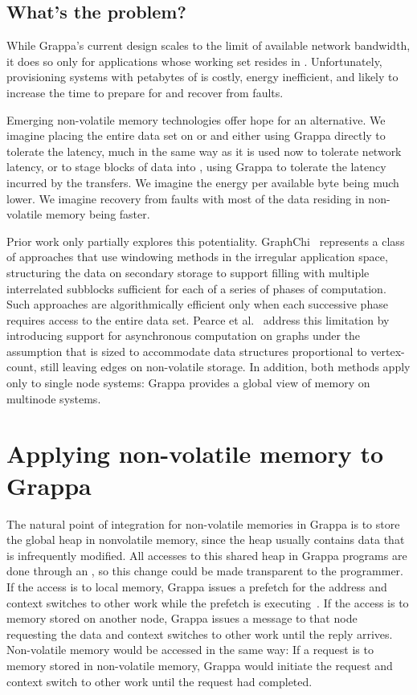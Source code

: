 \subsection{What's the problem?}

While Grappa's current design scales to the limit of available network
bandwidth, it does so only for applications whose working set resides
in \@.  Unfortunately, provisioning systems with petabytes of  is
costly, energy inefficient, and likely to increase the time to prepare
for and recover from faults.

Emerging non-volatile memory technologies offer hope for an
alternative.  We imagine placing the entire data set on  or  and
either using Grappa directly to tolerate the latency, much in the same
way as it is used now to tolerate network latency, or to stage blocks
of data into , using Grappa to tolerate the latency incurred by the
transfers.  We imagine the energy per available byte being much lower.
We imagine recovery from faults with most of the data residing in
non-volatile memory being faster.

Prior work only partially explores this potentiality. GraphChi~\cite{graphchi:osdi12}
represents a class of approaches that use windowing methods in the
irregular application space, structuring the data on secondary storage
to support filling  with multiple interrelated subblocks sufficient
for each of a series of phases of computation.  Such approaches are
algorithmically efficient only when each successive phase requires
access to the entire data set.  Pearce et al.~\cite{magt:2010} address this limitation by
introducing support for asynchronous computation on graphs under the
assumption that  is sized to accommodate data structures
proportional to vertex-count, still leaving edges on non-volatile
storage.  In addition, both methods apply only to single node systems:
Grappa provides a global view of memory on multinode systems.

\section{Applying non-volatile memory to Grappa}
The natural point of integration for non-volatile memories in Grappa
is to store the global heap in nonvolatile memory, since the heap
usually contains data that is infrequently modified. All accesses to
this shared heap in Grappa programs are done through an , so this change could be made transparent to the programmer. If the
access is to local memory, Grappa issues a prefetch for the address
and context switches to other work while the prefetch is executing~\cite{Nelson:hotpar2011}. If
the access is to memory stored on another node, Grappa issues a
message to that node requesting the data and context switches to other
work until the reply arrives. Non-volatile memory would be accessed in
the same way: If a request is to memory stored in non-volatile memory,
Grappa would initiate the request and context switch to other work
until the request had completed.

